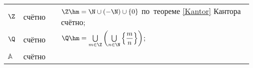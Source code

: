 
\begin{tabular}{llll}
$\Z$&счётно& &$\Z\hm=\N\cup(-\N)\cup\{0\}$ по~теореме \ref{Kantor} Кантора счётно;\\
$\Q$&счётно& &$\Q\hm=\bigcup\limits_{m\in\Z}\left(\bigcup\limits_{n\in \N}\left\{\dfrac mn\right\}\right)$;\\ $\mathbb{A}$&счётно& &
\end{tabular}
